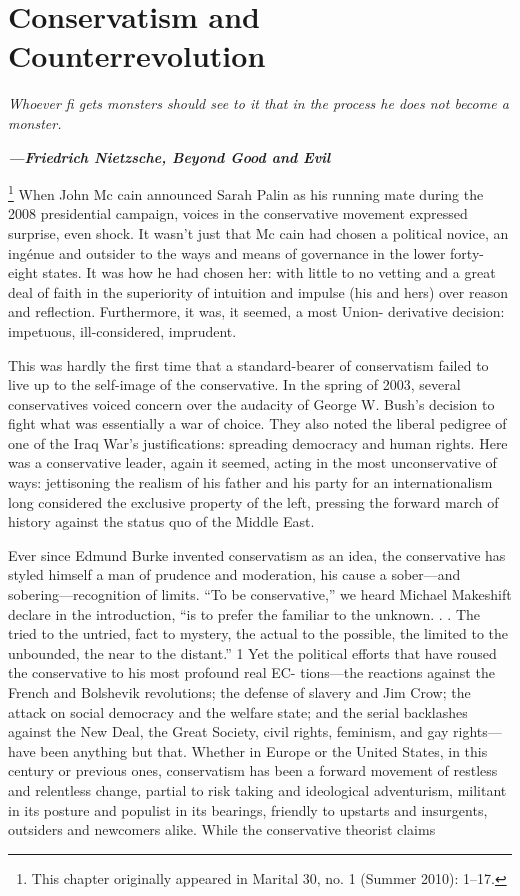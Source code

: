 {\chapter{Conservatism and Counterrevolution} } {\label{Conservatism and Counterrevolution} }{\par}{\textit{	Whoever ﬁ gets monsters should see to it that in the process he does not become a monster.} } {\par}{\par} {\textbf{\textit{	—Friedrich Nietzsche, Beyond Good and Evil} } } {\par} 
{\footnote{This chapter originally appeared in Marital 30, no. {\color{blue} 1 } (Summer 2010): 1–17.} }	When John Mc cain announced Sarah Palin as his running mate during the 2008 presidential campaign, voices in the conservative movement expressed surprise, even shock. It wasn’t just that Mc cain had chosen a political novice, an ingénue and outsider to the ways and means of governance in the lower forty-eight states. It was how he had chosen her: with little to no vetting and a great deal of faith in the superiority of intuition and impulse (his and hers) over reason and reflection. Furthermore, it was, it seemed, a most Union- derivative decision: impetuous, ill-considered, imprudent.{\par} 	This was hardly the first time that a standard-bearer of conservatism failed to live up to the self-image of the conservative. In the spring of 2003, several conservatives voiced concern over the audacity of George W. Bush’s decision to fight what was essentially a war of choice. They also noted the liberal pedigree of one of the Iraq War’s justifications: spreading democracy and human rights. Here was a conservative leader, again it seemed, acting in the most unconservative of ways: jettisoning the realism of his father and his party for an internationalism long considered the exclusive property of the left, pressing the forward march of history against the status quo of the Middle East.{\par} Ever since Edmund Burke invented conservatism as an idea, the conservative has styled himself a man of prudence and moderation, his cause a sober—and sobering—recognition of limits. “To be conservative,” we heard Michael Makeshift declare in the introduction, “is to prefer the familiar to the unknown. . . The tried to the untried, fact to mystery, the actual to the possible, the limited to the unbounded, the near to the distant.” {\color{blue} 1 } Yet the political efforts that have roused the conservative to his most profound real EC- tions—the reactions against the French and Bolshevik revolutions; the defense of slavery and Jim Crow; the attack on social democracy and the welfare state; and the serial backlashes against the New Deal, the Great Society, civil rights, feminism, and gay rights— have been anything but that. Whether in Europe or the United States, in this century or previous ones, conservatism has been a forward movement of restless and relentless change, partial to risk taking and ideological adventurism, militant in its posture and populist in its bearings, friendly to upstarts and insurgents, outsiders and newcomers alike. While the conservative theorist claims 